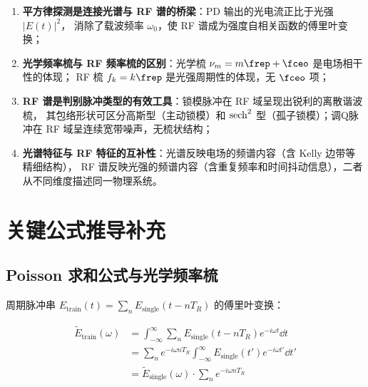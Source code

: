 \documentclass[11pt,a4paper]{article}
\begin{document}
\begin{enumerate}[label=(\arabic*)]
    \item \textbf{平方律探测是连接光谱与 RF 谱的桥梁}：PD 输出的光电流正比于光强 $|E(t)|^2$，
    消除了载波频率 $\omega_0$，使 RF 谱成为强度自相关函数的傅里叶变换；

    \item \textbf{光学频率梳与 RF 频率梳的区别}：光学梳 $\nu_m = m\frep + \fceo$ 是电场相干性的体现；
    RF 梳 $f_k = k\frep$ 是光强周期性的体现，无 $\fceo$ 项；

    \item \textbf{RF 谱是判别脉冲类型的有效工具}：锁模脉冲在 RF 域呈现出锐利的离散谐波梳，
    其包络形状可区分高斯型（主动锁模）和 $\sech^2$ 型（孤子锁模）；调Q脉冲在 RF 域呈连续宽带噪声，无梳状结构；

    \item \textbf{光谱特征与 RF 特征的互补性}：光谱反映电场的频谱内容（含 Kelly 边带等精细结构），
    RF 谱反映光强的频谱内容（含重复频率和时间抖动信息），二者从不同维度描述同一物理系统。
\end{enumerate}

\printbibliography[heading=bibintoc, title={参考文献}]

\appendix
\section{关键公式推导补充}

\subsection{Poisson 求和公式与光学频率梳}

周期脉冲串 $E_{\text{train}}(t) = \sum_n E_{\text{single}}(t - nT_R)$ 的傅里叶变换：

\begin{equation}
\begin{aligned}
\tilde{E}_{\text{train}}(\omega) &= \int_{-\infty}^{\infty} \sum_n E_{\text{single}}(t - nT_R) e^{-i\omega t} \dd{t} \\
&= \sum_n e^{-i\omega n T_R} \int_{-\infty}^{\infty} E_{\text{single}}(t') e^{-i\omega t'} \dd{t'} \\
&= \tilde{E}_{\text{single}}(\omega) \cdot \sum_n e^{-i\omega n T_R}
\end{aligned}
\end{equation}
\end{document}
